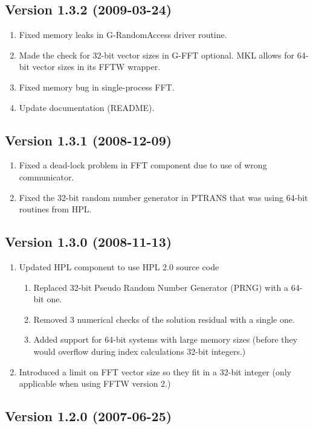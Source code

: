 \documentclass[twocolumn]{article}
\begin{document}
\subsection{Version 1.3.2 (2009-03-24)}
\begin{enumerate}
\item Fixed memory leaks in G-RandomAccess driver routine.
\item Made the check for 32-bit vector sizes in G-FFT optional. MKL allows for 64-bit vector sizes in its FFTW wrapper.
\item Fixed memory bug in single-process FFT.
\item Update documentation (README).
\end{enumerate}

\subsection{Version 1.3.1 (2008-12-09)}
\begin{enumerate}
\item Fixed a dead-lock problem in FFT component due to use of wrong communicator.
\item Fixed the 32-bit random number generator in PTRANS that was using 64-bit
routines from HPL.
\end{enumerate}

\subsection{Version 1.3.0 (2008-11-13)}
\begin{enumerate}
\item Updated HPL component to use HPL 2.0 source code
  \begin{enumerate}
  \item Replaced 32-bit Pseudo Random Number Generator (PRNG) with a 64-bit one.
  \item Removed 3 numerical checks of the solution residual with a single one.
  \item Added support for 64-bit systems with large memory sizes (before they would
  overflow during index calculations 32-bit integers.)
  \end{enumerate}
\item Introduced a limit on FFT vector size so they fit in a 32-bit integer (only
applicable when using FFTW version 2.)
\end{enumerate}

\subsection{Version 1.2.0 (2007-06-25)}
\end{document}
